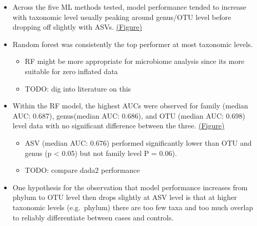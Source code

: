 \documentclass[
]{article}
\providecommand{\tightlist}{%
  \setlength{\itemsep}{0pt}\setlength{\parskip}{0pt}}
\begin{document}
\begin{itemize}
\tightlist
\item
  Across the five ML methods tested, model performance tended to
  increase with taxonomic level usually peaking around genus/OTU level
  before dropping off slightly with ASVs.
  \protect\hyperlink{model-performance-across-taxonomy}{(Figure)}
\item
  Random forest was consistently the top performer at most taxonomic
  levels.

  \begin{itemize}
  \tightlist
  \item
    RF might be more appropriate for microbiome analysis since its more
    suitable for zero inflated data
  \item
    TODO: dig into literature on this
  \end{itemize}
\item
  Within the RF model, the highest AUCs were observed for family (median
  AUC: 0.687), genus(median AUC: 0.686), and OTU (median AUC: 0.698)
  level data with no significant difference between the three.
  \protect\hyperlink{random-forest-model-performance-with-significance}{(Figure)}

  \begin{itemize}
  \tightlist
  \item
    ASV (median AUC: 0.676) performed significantly lower than OTU and
    genus (p \textless{} 0.05) but not family level P = 0.06).
  \item
    TODO: compare dada2 performance
  \end{itemize}
\item
  One hypothesis for the observation that model performance increases
  from phylum to OTU level then drops slightly at ASV level is that at
  higher taxonomic levels (e.g.~phylum) there are too few taxa and too
  much overlap to reliably differentiate between cases and controls.


\end{itemize}
\end{document}
